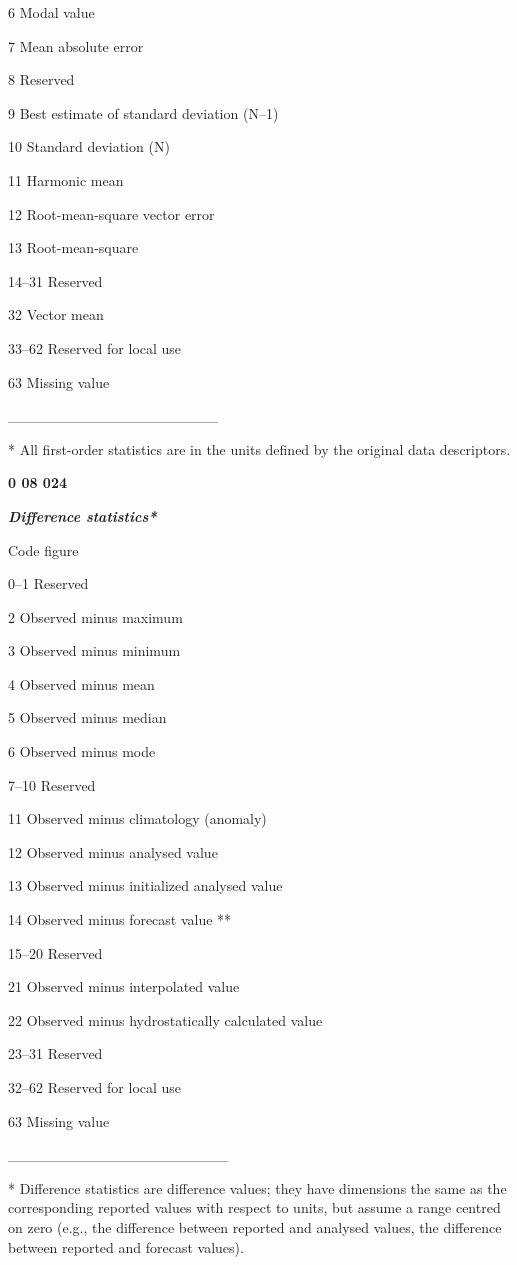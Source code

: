 6 Modal value

7 Mean absolute error

8 Reserved

9 Best estimate of standard deviation (N--1)

10 Standard deviation (N)

11 Harmonic mean

12 Root-mean-square vector error

13 Root-mean-square

14--31 Reserved

32 Vector mean

33--62 Reserved for local use

63 Missing value

\_\_\_\_\_\_\_\_\_\_\_\_\_\_\_\_\_\_\_\_

* All first-order statistics are in the units defined by the original data descriptors.

\textbf{0 08 024}

\emph{\textbf{Difference statistics*}}

Code figure

0--1 Reserved

2 Observed minus maximum

3 Observed minus minimum

4 Observed minus mean

5 Observed minus median

6 Observed minus mode

7--10 Reserved

11 Observed minus climatology (anomaly)

12 Observed minus analysed value

13 Observed minus initialized analysed value

14 Observed minus forecast value **

15--20 Reserved

21 Observed minus interpolated value

22 Observed minus hydrostatically calculated value

23--31 Reserved

32--62 Reserved for local use

63 Missing value

\_\_\_\_\_\_\_\_\_\_\_\_\_\_\_\_\_\_\_\_\_

* Difference statistics are difference values; they have dimensions the same as the corresponding reported values with respect to units, but assume a range centred on zero (e.g., the difference between reported and analysed values, the difference between reported and forecast values).

